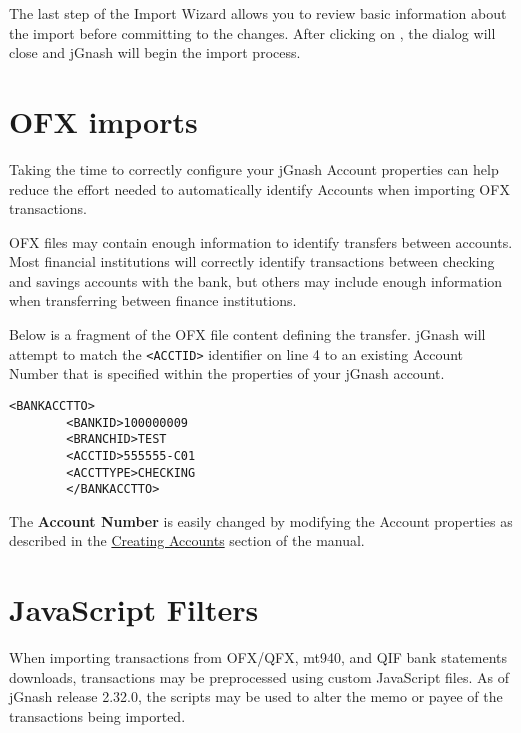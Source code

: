 \documentclass[letterpaper,12pt]{book}
\begin{document}
    The last step of the Import Wizard allows you to review basic information about
    the import before committing to the changes. After clicking on ,
    the dialog will close and jGnash will begin the import process.

    \section{OFX imports}
    Taking the time to correctly configure your jGnash Account properties can help
    reduce the effort needed to automatically identify Accounts when importing OFX
    transactions.

    OFX files may contain enough information to identify transfers between accounts.
    Most financial institutions will correctly identify transactions between checking
    and savings accounts with the bank, but others may include enough information
    when transferring between finance institutions.

    Below is a fragment of the OFX file content defining the transfer. jGnash will
    attempt to match the \texttt{<ACCTID>} identifier on line 4 to an existing Account Number
    that is specified within the properties of your jGnash account.
    \\ %
    \begin{lstlisting}[caption={OFX File Fragment}]
        <BANKACCTTO>
        <BANKID>100000009
        <BRANCHID>TEST
        <ACCTID>555555-C01
        <ACCTTYPE>CHECKING
        </BANKACCTTO>
    \end{lstlisting}

    The \textbf{Account Number} is easily changed by modifying the Account properties as described
    in the \hyperref[subsec:creatingAccounts]{Creating Accounts} section of the manual.

    \section{JavaScript Filters}
    When importing transactions from OFX/QFX, mt940, and QIF bank statements
    downloads, transactions may be preprocessed using custom JavaScript files. As
    of jGnash release 2.32.0, the scripts may be used to alter the memo or payee of
    the transactions being imported.
\end{document}

